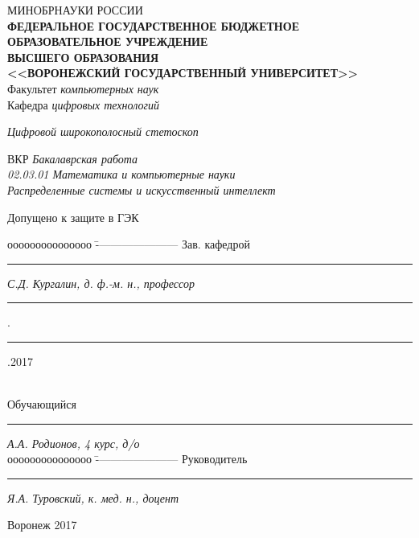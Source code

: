 \documentclass[../paper.tex]{subfiles}
\begin{document}
\begin{spacing}{1.2}
{\sffamily \begin{small}
\thispagestyle{empty}
\center 
{МИНОБРНАУКИ РОССИИ}\\ \!
{\footnotesize\textbf{ФЕДЕРАЛЬНОЕ ГОСУДАРСТВЕННОЕ БЮДЖЕТНОЕ ОБРАЗОВАТЕЛЬНОЕ УЧРЕЖДЕНИЕ}\\ \!\!\textbf{ВЫСШЕГО ОБРАЗОВАНИЯ}}\\ \!\!\!\!
\textbf{<<ВОРОНЕЖСКИЙ ГОСУДАРСТВЕННЫЙ УНИВЕРСИТЕТ>>}\\
\vspace{0.25cm}
{Факультет \textit{компьютерных наук}}\\
\vspace{0.25cm}
{Кафедра \textit{цифровых технологий}}\\

\vspace{1cm}

\textit{Цифровой широкополосный стетоскоп}\\

\vspace{1cm}

{ВКР} \textit{Бакалаврская работа}\\
\textit{02.03.01 Математика и компьютерные науки}\\
\textit{Распределенные системы и искусственный интеллект}\\

\vspace{4.0cm}
\begin{flushleft}
{Допущено к защите в ГЭК}
\end{flushleft}
\begin{tabbing}
ооооооооооооооо	\=	----------------------	\kill
Зав. кафедрой\> 	\rule[0mm]{3cm}{0,3mm}	\textit{С.Д. Кургалин, д. ф.-м. н., профессор}{ \rule[0mm]{5mm}{0,3mm}.\rule[0mm]{5mm}{0,3mm}.2017}  \\
Обучающийся \> 	\rule[0mm]{3cm}{0,3mm}	\textit{А.А. Родионов, 4 курс, д/о} \\ 
ооооооооооооооо	\=	----------------------	\kill
Руководитель\> 	\rule[0mm]{3cm}{0,3mm}  \textit{Я.А. Туровский, к. мед. н., доцент }
\end{tabbing}

\vspace{2cm}

\centerline{Воронеж 2017}
\end{small}}
\end{spacing}
\clearpage
\end{document}
